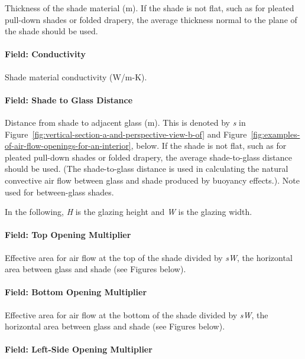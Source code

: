 Thickness of the shade material (m). If the shade is not flat, such as for pleated pull-down shades or folded drapery, the average thickness normal to the plane of the shade should be used.

\paragraph{Field: Conductivity}\label{field-conductivity-3}

Shade material conductivity (W/m-K).

\paragraph{Field: Shade to Glass Distance}\label{field-shade-to-glass-distance}

Distance from shade to adjacent glass (m). This is denoted by \emph{s} in Figure~\ref{fig:vertical-section-a-and-perspective-view-b-of} and Figure~\ref{fig:examples-of-air-flow-openings-for-an-interior}, below. If the shade is not flat, such as for pleated pull-down shades or folded drapery, the average shade-to-glass distance should be used. (The shade-to-glass distance is used in calculating the natural convective air flow between glass and shade produced by buoyancy effects.). Note used for between-glass shades.

In the following, \emph{H} is the glazing height and \emph{W} is the glazing width.

\paragraph{Field: Top Opening Multiplier}\label{field-top-opening-multiplier}

Effective area for air flow at the top of the shade divided by \emph{sW}, the horizontal area between glass and shade (see Figures below).

\paragraph{Field: Bottom Opening Multiplier}\label{field-bottom-opening-multiplier}

Effective area for air flow at the bottom of the shade divided by \emph{sW}, the horizontal area between glass and shade (see Figures below).

\paragraph{Field: Left-Side Opening Multiplier}\label{field-left-side-opening-multiplier}

